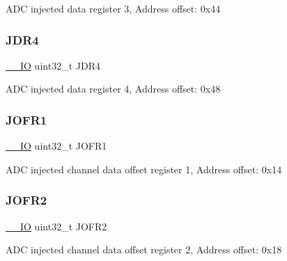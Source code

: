 A\+DC injected data register 3, Address offset\+: 0x44 \mbox{\label{struct_a_d_c___type_def_a9274ceea3b2c6d5c1903d0a7abad91a1}} 
\subsubsection{\texorpdfstring{J\+D\+R4}{JDR4}}
{\footnotesize\ttfamily \mbox{\hyperlink{core__sc300_8h_aec43007d9998a0a0e01faede4133d6be}{\+\_\+\+\_\+\+IO}} uint32\+\_\+t J\+D\+R4}

A\+DC injected data register 4, Address offset\+: 0x48 \mbox{\label{struct_a_d_c___type_def_a427dda1678f254bd98b1f321d7194a3b}} 
\subsubsection{\texorpdfstring{J\+O\+F\+R1}{JOFR1}}
{\footnotesize\ttfamily \mbox{\hyperlink{core__sc300_8h_aec43007d9998a0a0e01faede4133d6be}{\+\_\+\+\_\+\+IO}} uint32\+\_\+t J\+O\+F\+R1}

A\+DC injected channel data offset register 1, Address offset\+: 0x14 \mbox{\label{struct_a_d_c___type_def_a11e65074b9f06b48c17cdfa5bea9f125}} 
\subsubsection{\texorpdfstring{J\+O\+F\+R2}{JOFR2}}
{\footnotesize\ttfamily \mbox{\hyperlink{core__sc300_8h_aec43007d9998a0a0e01faede4133d6be}{\+\_\+\+\_\+\+IO}} uint32\+\_\+t J\+O\+F\+R2}

A\+DC injected channel data offset register 2, Address offset\+: 0x18 \mbox{\label{struct_a_d_c___type_def_a613f6b76d20c1a513976b920ecd7f4f8}} 
